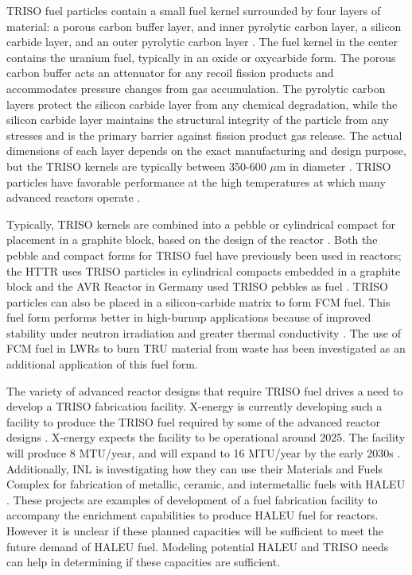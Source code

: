 \gls{TRISO} fuel particles contain 
a small fuel kernel surrounded by four layers of material: a porous carbon 
buffer layer, and inner pyrolytic carbon layer, a silicon carbide layer, 
and an outer pyrolytic carbon layer \cite{demkowicz_coated_2019}. The fuel 
kernel in the center contains the uranium fuel, typically in an oxide 
or oxycarbide form. The porous carbon buffer acts an attenuator for any 
recoil fission products and accommodates pressure changes from gas 
accumulation.
The pyrolytic carbon layers protect the silicon carbide layer from 
any chemical degradation, while the silicon carbide layer maintains the 
structural integrity of the particle from any stresses and is the primary 
barrier against fission product gas release. The actual dimensions 
of each layer depends on the exact manufacturing and design purpose, but 
the \gls{TRISO} kernels are typically between 350-600 $\mu$m in diameter 
\cite{demkowicz_coated_2019}. \gls{TRISO} particles have 
favorable performance at the high temperatures 
at which many advanced reactors operate \cite{demkowicz_coated_2019}. 

Typically, \gls{TRISO} kernels are combined into a pebble or 
cylindrical compact for placement in a graphite block, based on the 
design of the reactor \cite{demkowicz_coated_2019}. Both the 
pebble and compact forms for 
\gls{TRISO} fuel have previously been used in reactors; the \gls{HTTR}
uses 
\gls{TRISO} particles in cylindrical compacts embedded in a graphite block 
\cite{shiozawa_overview_2004} and the AVR Reactor in Germany used 
\gls{TRISO} pebbles as fuel \cite{gottaut_results_1990}.
\gls{TRISO} particles can also be placed in a silicon-carbide matrix 
to form \gls{FCM} fuel. This fuel form performs better in high-burnup 
applications because of improved stability under neutron irradiation and 
greater thermal conductivity \cite{snead_fully_2011}. The use of 
\gls{FCM} fuel in \glspl{LWR} to burn \gls{TRU} material from waste 
has been investigated \cite{snead_fully_2011,venneri_fully_2011} as 
an additional application of this fuel form. 

The variety of advanced reactor designs that require \gls{TRISO} fuel 
drives a need to develop a \gls{TRISO} fabrication facility. 
X-energy is currently developing such a facility to 
produce the \gls{TRISO} fuel required by some of the advanced 
reactor designs \cite{x-energy_triso-x_2022}. X-energy expects the 
facility to be operational around 2025. The facility will 
produce 8 MTU/year, and will expand to 16 MTU/year 
by the early 2030s \cite{x-energy_triso-x_2022}. Additionally,
\gls{INL} is investigating 
how they can use their Materials and Fuels Complex for 
fabrication of metallic, ceramic, and intermetallic fuels with 
\gls{HALEU} \cite{crawford_fuel_2019}. These projects 
are examples of development 
of a fuel fabrication facility to accompany the enrichment 
capabilities to produce \gls{HALEU} fuel for reactors. However
it is unclear if these planned capacities will be sufficient to 
meet the future demand of \gls{HALEU} fuel. Modeling potential 
\gls{HALEU} and \gls{TRISO} needs can help in determining if 
these capacities are sufficient. 

